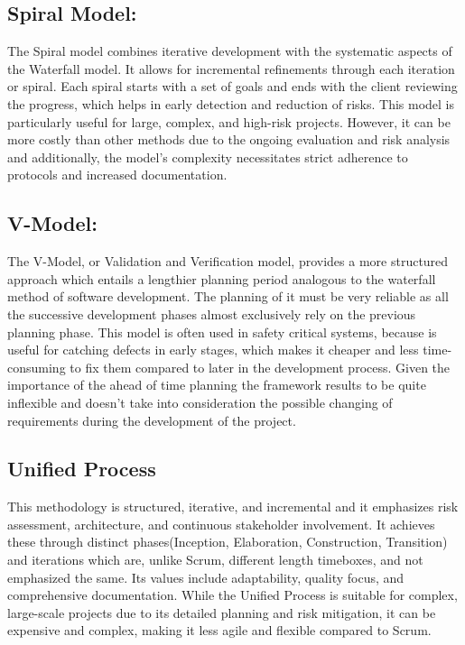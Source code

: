 \documentclass[12pt]{report}
\begin{document}
\subsection*{Spiral Model:} 
The Spiral model combines iterative development with the systematic aspects of the Waterfall model. It allows for incremental refinements through each iteration or spiral. Each spiral starts with a set of goals and ends with the client reviewing the progress, which helps in early detection and reduction of risks. This model is particularly useful for large, complex, and high-risk projects. However, it can be more costly than other methods due to the ongoing evaluation and risk analysis and additionally, the model's complexity necessitates strict adherence to protocols and increased documentation.

\subsection*{V-Model:} 
The V-Model, or Validation and Verification model, provides a more structured approach which entails a lengthier planning period analogous to the waterfall method of software development. The planning of it must be very reliable as all the successive development phases almost exclusively rely on the previous planning phase. This model is often used in safety critical systems, because is useful for catching defects in early stages, which makes it cheaper and less time-consuming to fix them compared to later in the development process. Given the importance of the ahead of time planning the framework results to be quite inflexible and doesn't take into consideration the possible changing of requirements during the development of the project.

\subsection*{Unified Process}
This methodology is structured, iterative, and incremental and it emphasizes risk assessment, architecture, and continuous stakeholder involvement. It achieves these through distinct phases(Inception, Elaboration, Construction, Transition) and iterations which are, unlike Scrum, different length timeboxes, and not emphasized the same. Its values include adaptability, quality focus, and comprehensive documentation. While the Unified Process is suitable for complex, large-scale projects due to its detailed planning and risk mitigation, it can be expensive and complex, making it less agile and flexible compared to Scrum.
\end{document}

